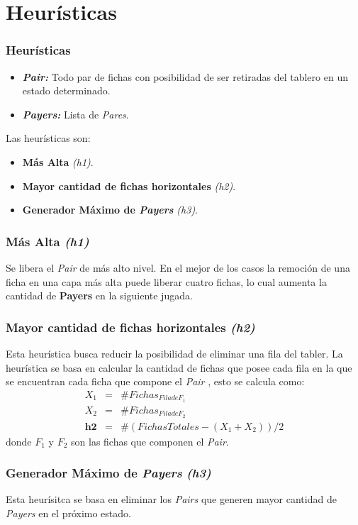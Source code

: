 \documentclass{beamer}
\begin{document}
\section{Heur\'isticas}
\begin{frame}
  \frametitle{Heur\'isticas}
   \begin{itemize}
	   	\item \textbf{\textit{Pair:}} Todo par de fichas con posibilidad de ser retiradas del tablero en un estado determinado.
	   	\item \textbf{\textit{Payers:}} Lista de \textit{Pares}. \\
   \end{itemize}
   Las heur\'isticas son:
   \begin{itemize}
		\item \textbf{M\'as Alta} \textit{(h1)}.
		\item \textbf{Mayor cantidad de fichas horizontales} \textit{(h2)}.
		\item \textbf{Generador M\'aximo de \textit{Payers}} \textit{(h3)}.
	\end{itemize}
\end{frame}

\begin{frame}
\frametitle{M\'as Alta \textit{(h1)}}
Se libera el \textit{Pair} de m\'as alto nivel. En el mejor de los casos la remoci\'on de una ficha en una capa m\'as alta puede liberar cuatro fichas, lo cual aumenta la cantidad de \textbf{Payers} en la siguiente jugada.
\end{frame}

\begin{frame}
\frametitle{Mayor cantidad de fichas horizontales \textit{(h2)}}
Esta heur\'istica busca reducir la posibilidad de eliminar una fila del tabler. La heur\'istica se basa en calcular la cantidad de fichas que posee cada fila en la que se encuentran cada ficha que compone el \textit{Pair} , esto se calcula como:
			\begin{eqnarray}
				X_{1}  & = & \# Fichas_{Fila de F_{1}} \\
				X_{2}  & = & \# Fichas_{Fila de F_{2}} \\
				\textbf{h2} & = & \#(FichasTotales - ( X_{1} + X_{2} )) / 2
			\end{eqnarray}
		donde $F_{1}$ y $F_{2}$ son las fichas que componen el \textit{Pair}. 
\end{frame}

\begin{frame}
\frametitle{Generador M\'aximo de \textit{Payers} \textit{(h3)}}

Esta heur\'isitca se basa en eliminar los \textit{Pairs} que generen mayor cantidad de \textit{Payers} en el pr\'oximo estado.
\end{frame}
\end{document}
